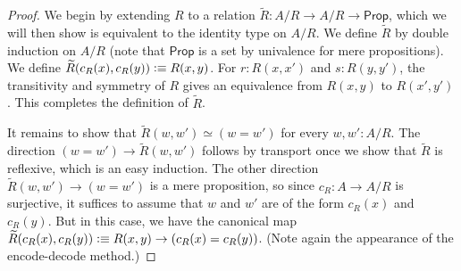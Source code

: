 \documentclass[10pt,a4paper]{article}
\providecommand{\index}[1]{}
\newcommand{\defeq}{\vcentcolon\equiv}  %
\newcommand{\eqvsym}{\simeq}    %
\newcommand{\prop}{\ensuremath{\mathsf{Prop}}\xspace}
\theoremstyle{definition}
\theoremstyle{remark}
\numberwithin{equation}{section}
\begin{document}
\begin{proof}
We begin by extending $R$ to a relation $\widetilde{R}:A/R\to A/R\to\prop$, which we will then show is equivalent
to the identity type on $A/R$. We define $\widetilde{R}$ by double induction on
$A/R$ (note that $\prop$ is a set by univalence for mere propositions). We
define $\widetilde{R}(c_R(x),c_R(y)) \defeq R(x,y)$. For $r:R(x,x')$ and $s:R(y,y')$,
the transitivity and symmetry
of $R$ gives an equivalence from $R(x,y)$ to $R(x',y')$. This completes the
definition of $\widetilde{R}$.

It remains to show that $\widetilde{R}(w,w')\eqvsym (w= w')$ for every $w,w':A/R$.
The direction $(w=w')\to \widetilde{R}(w,w')$ follows by transport once we show that $\widetilde{R}$ is reflexive, which is an easy induction.
The other direction $\widetilde{R}(w,w')\to (w= w')$ is a mere proposition, so since $c_R:A\to A/R$ is surjective, it suffices to assume that $w$ and $w'$ are of the form $c_R(x)$ and $c_R(y)$.
But in this case, we have the canonical map $\widetilde{R}(c_R(x),c_R(y)) \defeq R(x,y) \to (c_R(x)=c_R(y))$.
(Note again the appearance of the encode-decode method.\index{encode-decode method})
\end{proof}
\end{document}
